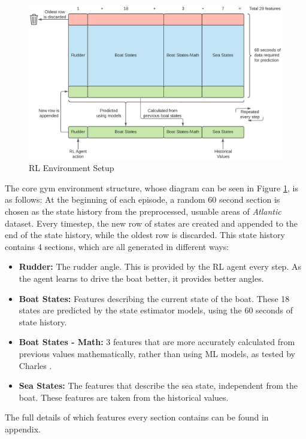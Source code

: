 \documentclass[12pt,twoside]{report}
\begin{document}
\begin{figure}[htbp]
\includegraphics[width=1.1\textwidth,center]{figures/rl-env/JTR env setup.png}
\caption{RL Environment Setup}
\label{fig:env-setup}
\end{figure}

The core gym environment structure, whose diagram can be seen in Figure \ref{fig:env-setup}, is as follows: At the beginning of each episode, a random 60 second section is chosen as the state history from the preprocessed, usuable areas of \textit{Atlantic} dataset. Every timestep, the new row of states are created and appended to the end of the state history, while the oldest row is discarded. This state history contains 4 sections, which are all generated in different ways:

\begin{itemize}
    \item \textbf{Rudder:} The rudder angle. This is provided by the RL agent every step. As the agent learns to drive the boat better, it provides better angles.
    \item \textbf{Boat States:} Features describing the current state of the boat. These 18 states are predicted by the state estimator models, using the 60 seconds of state history.
    \item \textbf{Boat States - Math:} 3 features that are more accurately calculated from previous values mathematically, rather than using ML models, as tested by Charles \cite{charles}.
    \item \textbf{Sea States:} The features that describe the sea state, independent from the boat. These features are taken from the historical values.
\end{itemize}

\noindent The full details of which features every section contains can be found in appendix.
\end{document}
